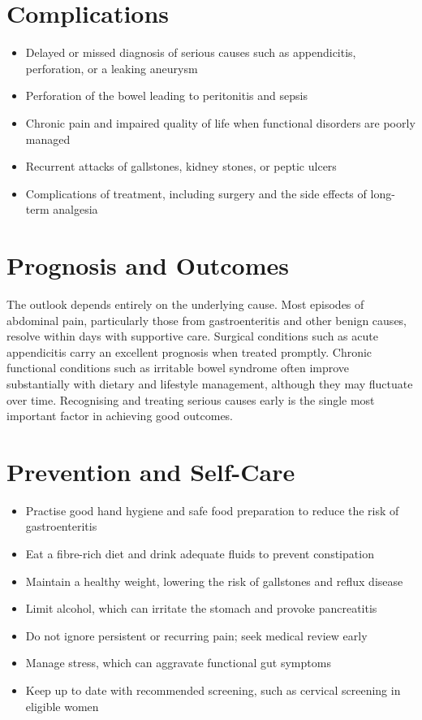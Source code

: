 \section*{Complications}
\begin{itemize}
    \item Delayed or missed diagnosis of serious causes such as appendicitis, perforation, or a leaking aneurysm
    \item Perforation of the bowel leading to peritonitis and sepsis
    \item Chronic pain and impaired quality of life when functional disorders are poorly managed
    \item Recurrent attacks of gallstones, kidney stones, or peptic ulcers
    \item Complications of treatment, including surgery and the side effects of long-term analgesia
\end{itemize}

\section*{Prognosis and Outcomes}
The outlook depends entirely on the underlying cause. Most episodes of abdominal pain, particularly those from gastroenteritis and other benign causes, resolve within days with supportive care. Surgical conditions such as acute appendicitis carry an excellent prognosis when treated promptly. Chronic functional conditions such as irritable bowel syndrome often improve substantially with dietary and lifestyle management, although they may fluctuate over time. Recognising and treating serious causes early is the single most important factor in achieving good outcomes.

\section*{Prevention and Self-Care}
\begin{itemize}
    \item Practise good hand hygiene and safe food preparation to reduce the risk of gastroenteritis
    \item Eat a fibre-rich diet and drink adequate fluids to prevent constipation
    \item Maintain a healthy weight, lowering the risk of gallstones and reflux disease
    \item Limit alcohol, which can irritate the stomach and provoke pancreatitis
    \item Do not ignore persistent or recurring pain; seek medical review early
    \item Manage stress, which can aggravate functional gut symptoms
    \item Keep up to date with recommended screening, such as cervical screening in eligible women
\end{itemize}


